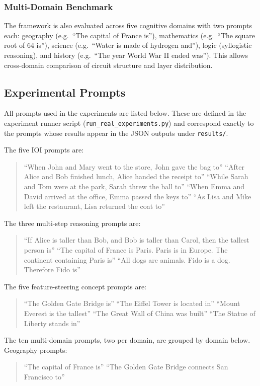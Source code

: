 \subsubsection{Multi-Domain Benchmark}

The framework is also evaluated
across five cognitive domains with two prompts each:
geography (e.g.\ ``The capital of France is''),
mathematics (e.g.\ ``The square root of 64 is''),
science (e.g.\ ``Water is made of hydrogen and''),
logic (syllogistic reasoning), and
history (e.g.\ ``The year World War II ended was'').
This allows cross-domain comparison of circuit structure and layer
distribution.

\subsection{Experimental Prompts}

All prompts used in the experiments are listed below.  These are
defined in the experiment runner script (\texttt{run\_real\_experiments.py}) and
correspond exactly to the prompts whose results appear in the JSON
outputs under \texttt{results/}.

The five IOI prompts are:
\begin{quote}
``When John and Mary went to the store, John gave the bag to''
``After Alice and Bob finished lunch, Alice handed the receipt to''
``While Sarah and Tom were at the park, Sarah threw the ball to''
``When Emma and David arrived at the office, Emma passed the keys to''
``As Lisa and Mike left the restaurant, Lisa returned the coat to''
\end{quote}

The three multi-step reasoning prompts are:
\begin{quote}
``If Alice is taller than Bob, and Bob is taller than Carol, then the tallest person is''
``The capital of France is Paris. Paris is in Europe. The continent containing Paris is''
``All dogs are animals. Fido is a dog. Therefore Fido is''
\end{quote}

The five feature-steering concept prompts are:
\begin{quote}
``The Golden Gate Bridge is''
``The Eiffel Tower is located in''
``Mount Everest is the tallest''
``The Great Wall of China was built''
``The Statue of Liberty stands in''
\end{quote}

The ten multi-domain prompts, two per domain, are grouped by domain below.
Geography prompts:
\begin{quote}
``The capital of France is''
``The Golden Gate Bridge connects San Francisco to''
\end{quote}

